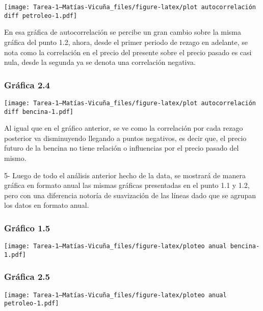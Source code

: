\documentclass[
]{article}
\begin{document}
\texttt{[image: Tarea-1---Matías-Vicuña\_files/figure-latex/plot autocorrelación diff petroleo-1.pdf]}

En esa gráfica de autocorrelación se percibe un gran cambio sobre la
misma gráfica del punto 1.2, ahora, desde el primer periodo de rezago en
adelante, se nota como la correlación en el precio del presente sobre el
precio pasado es casi nula, desde la segunda ya se denota una
correlación negativa.

\hypertarget{gruxe1fica-2.4}{%
\subsubsection{Gráfica 2.4}\label{gruxe1fica-2.4}}

\texttt{[image: Tarea-1---Matías-Vicuña\_files/figure-latex/plot autocorrelación diff bencina-1.pdf]}

Al igual que en el gráfico anterior, se ve como la correlación por cada
rezago posterior va disminuyendo llegando a puntos negativos, es decir
que, el precio futuro de la bencina no tiene relación o influencias por
el precio pasado del mismo.

\newpage

5- Luego de todo el análisis anterior hecho de la data, se mostrará de
manera gráfica en formato anual las mismas gráficas presentadas en el
punto 1.1 y 1.2, pero con una diferencia notoría de suavización de las
líneas dado que se agrupan los datos en formato anual.

\hypertarget{gruxe1fico-1.5}{%
\subsubsection{Gráfico 1.5}\label{gruxe1fico-1.5}}

\texttt{[image: Tarea-1---Matías-Vicuña\_files/figure-latex/ploteo anual bencina-1.pdf]}

\vspace{3mm}

\hypertarget{gruxe1fica-2.5}{%
\subsubsection{Gráfica 2.5}\label{gruxe1fica-2.5}}

\texttt{[image: Tarea-1---Matías-Vicuña\_files/figure-latex/ploteo anual petroleo-1.pdf]}
\end{document}
